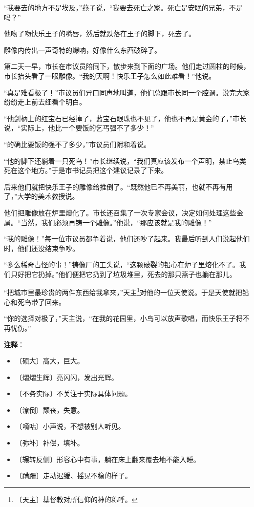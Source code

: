 \documentclass[12pt,UTF-8,openany]{ctexbook}
\begin{document}
\begin{normalsize}
    “我要去的地方不是埃及，”燕子说，“我要去死亡之家。死亡是安眠的兄弟，不是吗？”
    
    他吻了吻快乐王子的嘴唇，然后就跌落在王子的脚下，死去了。
    
    雕像内传出一声奇特的爆响，好像什么东西破碎了。
    
    第二天一早，市长在市议员陪同下，散步来到下面的广场。他们走过圆柱的时候，市长抬头看了一眼雕像。“我的天啊！快乐王子怎么如此难看！”他说。
    
    “真是难看极了！”市议员们异口同声地叫道，他们总跟市长同一个腔调。说完大家纷纷走上前去细看个明白。
    
    “他剑柄上的红宝石已经掉了，蓝宝石眼珠也不见了，他也不再是黄金的了，”市长说，“实际上，他比一个要饭的乞丐强不了多少！”
    
    “的确比要饭的强不了多少，”市议员们附和着说。
    
    “他的脚下还躺着一只死鸟！”市长继续说，“我们真应该发布一个声明，禁止鸟类死在这个地方。”于是市书记员把这个建议记录了下来。
    
    后来他们就把快乐王子的雕像给推倒了。“既然他已不再美丽，也就不再有用了，”大学的美术教授说。
    
    他们把雕像放在炉里熔化了。市长还召集了一次专家会议，决定如何处理这些金属。“当然，我们必须再铸一个雕像。”他说，“那应该就是我的雕像！”
    
    “我的雕像！”每一位市议员都争着说，他们还吵了起来。我最后听到人们说起他们时，他们还没结束争吵。
    
    “多么稀奇古怪的事！”铸像厂的工头说，“这颗破裂的铅心在炉子里熔化不了。我们只好把它扔掉。”他们便把它扔到了垃圾堆里，死去的那只燕子也躺在那儿。
    
    “把城市里最珍贵的两件东西给我拿来，”天主\footnote{〔天主〕基督教对所信仰的神的称呼。}对他的一位天使说。于是天使就把铅心和死鸟带了回来。
    
    “你的选择对极了，”天主说，“在我的花园里，小鸟可以放声歌唱，而快乐王子将不再忧伤。”
    
\end{normalsize}


\newpage

\textbf{注释}：

\vspace{-1em}

\begin{itemize}
    \setlength\itemsep{-0.2em}
    \item 〔硕大〕高大，巨大。
    \item 〔熠熠生辉〕亮闪闪，发出光辉。
    \item 〔不务实际〕不关注于实际具体问题。
    \item 〔潦倒〕颓丧，失意。
    \item 〔嘀咕〕小声说，不想被别人听见。
    \item 〔弥补〕补偿，填补。
    \item 〔辗转反侧〕形容心中有事，躺在床上翻来覆去地不能入睡。
    \item 〔蹒跚〕走动迟缓、摇晃不稳的样子。
\end{itemize}
\end{document}
